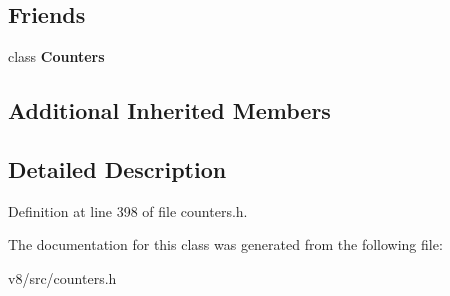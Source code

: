 \subsection*{Friends}
\begin{DoxyCompactItemize}
\item 
\mbox{\label{classv8_1_1internal_1_1HistogramTimer_a5545327f141103b96b160ddc48274bc0}} 
class {\bfseries Counters}
\end{DoxyCompactItemize}
\subsection*{Additional Inherited Members}


\subsection{Detailed Description}


Definition at line 398 of file counters.\+h.



The documentation for this class was generated from the following file\+:\begin{DoxyCompactItemize}
\item 
v8/src/counters.\+h\end{DoxyCompactItemize}
